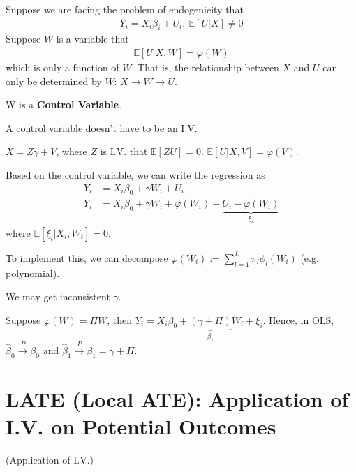 \documentclass[11pt]{elegantbook}
\begin{document}
Suppose we are facing the problem of endogenieity that
\begin{equation}
    \begin{aligned}
        Y_i=X_i\beta_i+U_i,\ \mathbb{E}[U|X]\neq 0
    \end{aligned}
    \nonumber
\end{equation}
Suppose $W$ is a variable that
\begin{equation}
    \begin{aligned}
        \mathbb{E}[U|X,W]=\varphi(W)
    \end{aligned}
    \nonumber
\end{equation}
which is only a function of $W$. That is, the relationship between $X$ and $U$ can only be determined by $W$: $X \rightarrow W \rightarrow U$.
\begin{definition}
    \normalfont
    W is a \textbf{Control Variable}.
\end{definition}
A control variable doesn't have to be an I.V.
\begin{example}
    $X=Z\gamma+V$, where $Z$ is I.V. that $\mathbb{E}[ZU]=0$. $\mathbb{E}[U|X,V]=\varphi(V)$.
\end{example}

Based on the control variable, we can write the regression as
\begin{equation}
    \begin{aligned}
        Y_i&=X_i\beta_0+\gamma W_i+U_i\\
        Y_i&=X_i\beta_0+\gamma W_i+\varphi(W_i)+\underbrace{U_i-\varphi(W_i)}_{\xi_i}
    \end{aligned}
    \nonumber
\end{equation}
where $\mathbb{E}[\xi_i|X_i,W_i]=0$.

To implement this, we can decompose $\varphi(W_i):=\sum_{l=1}^L\pi_l\phi_l(W_i)$ (e.g. polynomial).

\begin{note}
    We may get inconsistent $\gamma$.
\end{note}
\begin{example}
    Suppose $\varphi(W)=\Pi W$, then $Y_i=X_i\beta_0+\underbrace{(\gamma+\Pi)}_{\beta_1}W_i+\xi_i$. Hence, in OLS, $\hat{\beta}_0 \stackrel{P}{\longrightarrow} \beta_0$ and $\hat{\beta}_1 \stackrel{P}{\longrightarrow} \beta_1=\gamma+\Pi$.
\end{example}


\section{LATE (Local ATE): Application of I.V. on Potential Outcomes}
(Application of I.V.)
\end{document}
